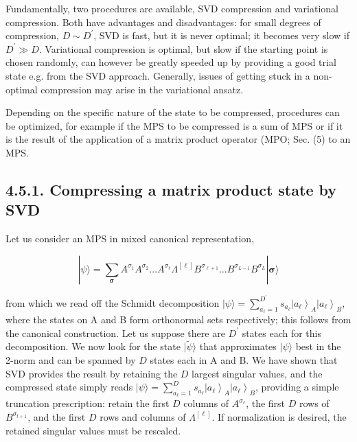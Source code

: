 \documentclass[12pt]{article}
\begin{document}
Fundamentally, two procedures are available, SVD compression and variational compression. Both have advantages and disadvantages: for small degrees of compression, $D \sim D^{\prime}$, SVD is fast, but it is never optimal; it becomes very slow if $D^{\prime} \gg D$. Variational compression is optimal, but slow if the starting point is chosen randomly, can however be greatly speeded up by providing a good trial state e.g. from the SVD approach. Generally, issues of getting stuck in a non-optimal compression may arise in the variational ansatz.

Depending on the specific nature of the state to be compressed, procedures can be optimized, for example if the MPS to be compressed is a sum of MPS or if it is the result of the application of a matrix product operator (MPO; Sec. (5) to an MPS.

\subsection*{4.5.1. Compressing a matrix product state by SVD}
Let us consider an MPS in mixed canonical representation,


\begin{equation*}
|\psi\rangle=\sum_{\boldsymbol{\sigma}} A^{\sigma_{1}} A^{\sigma_{2}} \ldots A^{\sigma_{\ell}} \Lambda^{[\ell]} B^{\sigma_{\ell+1}} \ldots B^{\sigma_{L-1}} B^{\sigma_{L}}|\boldsymbol{\sigma}\rangle \tag{138}
\end{equation*}


from which we read off the Schmidt decomposition $|\psi\rangle=\sum_{a_{\ell}=1}^{D^{\prime}} s_{a_{\ell}}\left|a_{\ell}\right\rangle_{A}\left|a_{\ell}\right\rangle_{B}$, where the states on A and B form orthonormal sets respectively; this follows from the canonical construction. Let us suppose there are $D^{\prime}$ states each for this decomposition. We now look for the state $|\tilde{\psi}\rangle$ that approximates $|\psi\rangle$ best in the 2-norm and can be spanned by $D$ states each in A and B. We have shown that SVD provides the result by retaining the $D$ largest singular values, and the compressed state simply reads $|\psi\rangle=\sum_{a_{\ell}=1}^{D} s_{a_{\ell}}\left|a_{\ell}\right\rangle_{A}\left|a_{\ell}\right\rangle_{B}$, providing a simple truncation prescription: retain the first $D$ columns of $A^{\sigma_{\ell}}$, the first $D$ rows of $B^{\sigma_{t+1}}$, and the first $D$ rows and columns of $\Lambda^{[\ell]}$. If normalization is desired, the retained singular values must be rescaled.
\end{document}
